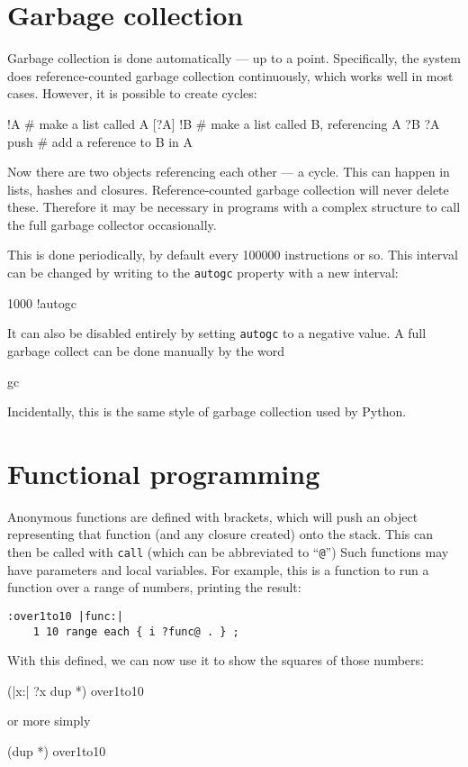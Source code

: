 \section{Garbage collection}
Garbage collection is done automatically --- up to a point. Specifically,
the system does reference-counted garbage collection continuously,
which works well in most cases. However, it is possible to
create cycles:
\begin{v}
    [] !A              # make a list called A
    [?A] !B            # make a list called B, referencing A
    ?B ?A push         # add a reference to B in A
\end{v}
Now there are two objects referencing each other --- a cycle. This can
happen in lists, hashes and closures. Reference-counted garbage
collection will never delete these. Therefore it may be necessary
in programs with a complex structure to call the full garbage collector
occasionally.

This is done periodically, by default every 100000 instructions or so.
This interval can be changed by writing to the \verb+autogc+ property
with a new interval:
\begin{v}
1000 !autogc
\end{v}
It can also be disabled entirely by setting \texttt{autogc} to a negative
value.
A full garbage collect can be done manually by the word
\begin{v}
    gc
\end{v}
Incidentally, this is
the same style of garbage collection used by Python.



\section{Functional programming}
\label{functional}
\indw{(}\indw{)}
Anonymous functions are defined with brackets, which will push an object
representing that function (and any closure created) onto the stack. This can
then be called with \texttt{call}  (which can be abbreviated to ``\texttt{@}'')
Such functions may have parameters and local variables.
For example, this is a function to run a function over a range of numbers,
printing the result:
\begin{lstlisting}
:over1to10 |func:|
    1 10 range each { i ?func@ . } ;
\end{lstlisting}
With this defined, we can now use it to show the squares of those
numbers:        
\begin{v}
    (|x:| ?x dup *) over1to10
\end{v}
or more simply
\begin{v}
    (dup *) over1to10
\end{v}

